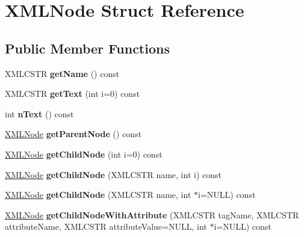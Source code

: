 \hypertarget{struct_x_m_l_node}{}\section{X\+M\+L\+Node Struct Reference}
\label{struct_x_m_l_node}
\subsection*{Public Member Functions}
\begin{DoxyCompactItemize}
\item 
\mbox{\label{struct_x_m_l_node_a78f873d053775e62bbe7e9b9ba9a0893}} 
X\+M\+L\+C\+S\+TR {\bfseries get\+Name} () const
\item 
\mbox{\label{struct_x_m_l_node_acfe86b318bec6ed981ec2ede1b82a01c}} 
X\+M\+L\+C\+S\+TR {\bfseries get\+Text} (int i=0) const
\item 
\mbox{\label{struct_x_m_l_node_a1cab1484d301f5b99a5fc74a0b05b47e}} 
int {\bfseries n\+Text} () const
\item 
\mbox{\label{struct_x_m_l_node_a4c1de07d0e519c6e1d54d855b47d9d6a}} 
\hyperlink{struct_x_m_l_node}{X\+M\+L\+Node} {\bfseries get\+Parent\+Node} () const
\item 
\mbox{\label{struct_x_m_l_node_ac34f1bdbf808d2ee89552415505bb673}} 
\hyperlink{struct_x_m_l_node}{X\+M\+L\+Node} {\bfseries get\+Child\+Node} (int i=0) const
\item 
\mbox{\label{struct_x_m_l_node_af082d930c7bc6f879ab282adbe48050f}} 
\hyperlink{struct_x_m_l_node}{X\+M\+L\+Node} {\bfseries get\+Child\+Node} (X\+M\+L\+C\+S\+TR name, int i) const
\item 
\mbox{\label{struct_x_m_l_node_ae67a570d76c61d12d26a309f4c5645e2}} 
\hyperlink{struct_x_m_l_node}{X\+M\+L\+Node} {\bfseries get\+Child\+Node} (X\+M\+L\+C\+S\+TR name, int $\ast$i=N\+U\+LL) const
\item 
\mbox{\label{struct_x_m_l_node_ad2665e479c488e525eba26659fe4034d}} 
\hyperlink{struct_x_m_l_node}{X\+M\+L\+Node} {\bfseries get\+Child\+Node\+With\+Attribute} (X\+M\+L\+C\+S\+TR tag\+Name, X\+M\+L\+C\+S\+TR attribute\+Name, X\+M\+L\+C\+S\+TR attribute\+Value=N\+U\+LL, int $\ast$i=N\+U\+LL) const

\end{DoxyCompactItemize}
